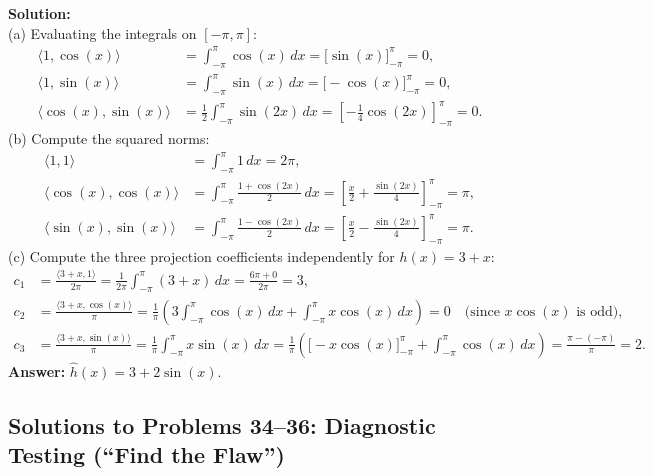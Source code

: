 \documentclass[11pt, letterpaper]{article}
\theoremstyle{definition}
\theoremstyle{remark}
\begin{document}
\textbf{Solution:} \\
(a) Evaluating the integrals on $[-\pi, \pi]$:
\begin{align*}
\langle 1, \cos(x) \rangle &= \int_{-\pi}^{\pi} \cos(x)\,dx = \bigl[\sin(x)\bigr]_{-\pi}^{\pi} = 0, \\
\langle 1, \sin(x) \rangle &= \int_{-\pi}^{\pi} \sin(x)\,dx = \bigl[-\cos(x)\bigr]_{-\pi}^{\pi} = 0, \\
\langle \cos(x), \sin(x) \rangle &= \frac{1}{2}\int_{-\pi}^{\pi} \sin(2x)\,dx = \left[-\frac{1}{4}\cos(2x)\right]_{-\pi}^{\pi} = 0.
\end{align*}
(b) Compute the squared norms:
\begin{align*}
\langle 1, 1 \rangle &= \int_{-\pi}^{\pi} 1\,dx = 2\pi, \\
\langle \cos(x), \cos(x) \rangle &= \int_{-\pi}^{\pi} \frac{1 + \cos(2x)}{2}\,dx = \left[\frac{x}{2} + \frac{\sin(2x)}{4}\right]_{-\pi}^{\pi} = \pi, \\
\langle \sin(x), \sin(x) \rangle &= \int_{-\pi}^{\pi} \frac{1 - \cos(2x)}{2}\,dx = \left[\frac{x}{2} - \frac{\sin(2x)}{4}\right]_{-\pi}^{\pi} = \pi.
\end{align*}
(c) Compute the three projection coefficients independently for $h(x) = 3 + x$:
\begin{align*}
c_1 &= \frac{\langle 3 + x, 1 \rangle}{2\pi} = \frac{1}{2\pi}\int_{-\pi}^{\pi} (3 + x)\,dx = \frac{6\pi + 0}{2\pi} = 3, \\
c_2 &= \frac{\langle 3 + x, \cos(x) \rangle}{\pi} = \frac{1}{\pi}\left(3\int_{-\pi}^{\pi}\cos(x)\,dx + \int_{-\pi}^{\pi} x\cos(x)\,dx\right) = 0 \quad \text{(since $x\cos(x)$ is odd)}, \\
c_3 &= \frac{\langle 3 + x, \sin(x) \rangle}{\pi} = \frac{1}{\pi}\int_{-\pi}^{\pi} x\sin(x)\,dx = \frac{1}{\pi}\left(\bigl[-x\cos(x)\bigr]_{-\pi}^{\pi} + \int_{-\pi}^{\pi}\cos(x)\,dx\right) = \frac{\pi - (-\pi)}{\pi} = 2.
\end{align*}
\textbf{Answer:} $\hat{h}(x) = 3 + 2\sin(x)$.

\subsection{Solutions to Problems 34--36: Diagnostic Testing (``Find the Flaw'')}
\end{document}
